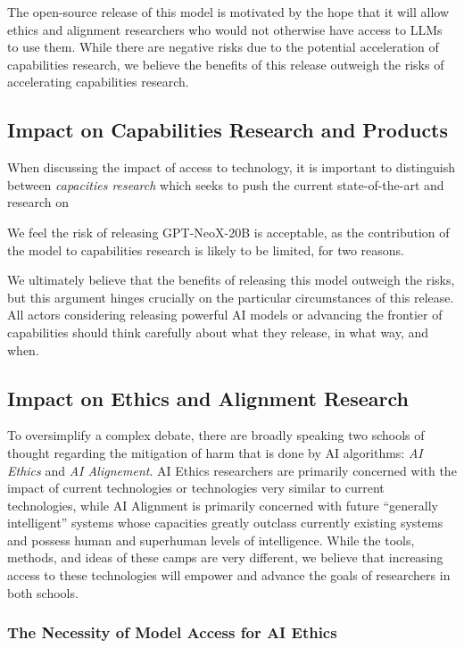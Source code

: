 \documentclass[11pt]{article}
\newcommand{\model}{GPT-NeoX-20B}
\begin{document}
The open-source release of this model is motivated by the hope that it will allow ethics and alignment researchers who would not otherwise have access to LLMs to use them. While there are negative risks due to the potential acceleration of capabilities research, we believe the benefits of this release outweigh the risks of accelerating capabilities research.

\subsection{Impact on Capabilities Research and Products}

When discussing the impact of access to technology, it is important to distinguish between \textit{capacities research} which seeks to push the current state-of-the-art and research on

We feel the risk of releasing \model{} is acceptable, as the contribution of the model to capabilities research is likely to be limited, for two reasons. 

We ultimately believe that the benefits of releasing this model outweigh the risks, but this argument hinges crucially on the particular circumstances of this release. All actors considering releasing powerful AI models or advancing the frontier of capabilities should think carefully about what they release, in what way, and when.

\subsection{Impact on Ethics and Alignment Research}

To oversimplify a complex debate, there are broadly speaking two schools of thought regarding the mitigation of harm that is done by AI algorithms: \textit{AI Ethics} and \textit{AI Alignement}. AI Ethics researchers are primarily concerned with the impact of current technologies or technologies very similar to current technologies, while AI Alignment is primarily concerned with future ``generally intelligent'' systems whose capacities greatly outclass currently existing systems and possess human and superhuman levels of intelligence. While the tools, methods, and ideas of these camps are very different, we believe that increasing access to these technologies will empower and advance the goals of researchers in both schools.

\subsubsection{The Necessity of Model Access for AI Ethics}
\end{document}
